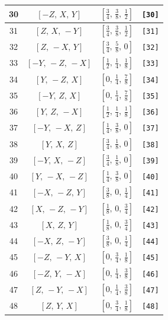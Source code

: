 \documentclass[fleqn,8pt]{jsarticle}
\begin{document}
\begin{longtable}{cccc}
30 & $\left[ - Z,\, X,\, Y \right]$ & $\left[ \frac{3}{4},\, \frac{3}{8},\, \frac{1}{2} \right]$ & {\tt [30]} \\ \hline
31 & $\left[ Z,\, X,\, - Y \right]$ & $\left[ \frac{3}{4},\, \frac{3}{8},\, \frac{1}{2} \right]$ & {\tt [31]} \\ \hline
32 & $\left[ Z,\, - X,\, Y \right]$ & $\left[ \frac{3}{4},\, \frac{5}{8},\, 0 \right]$ & {\tt [32]} \\ \hline
33 & $\left[ - Y,\, - Z,\, - X \right]$ & $\left[ \frac{1}{2},\, \frac{1}{4},\, \frac{1}{8} \right]$ & {\tt [33]} \\ \hline
34 & $\left[ Y,\, - Z,\, X \right]$ & $\left[ 0,\, \frac{1}{4},\, \frac{7}{8} \right]$ & {\tt [34]} \\ \hline
35 & $\left[ - Y,\, Z,\, X \right]$ & $\left[ 0,\, \frac{1}{4},\, \frac{7}{8} \right]$ & {\tt [35]} \\ \hline
36 & $\left[ Y,\, Z,\, - X \right]$ & $\left[ \frac{1}{2},\, \frac{1}{4},\, \frac{1}{8} \right]$ & {\tt [36]} \\ \hline
37 & $\left[ - Y,\, - X,\, Z \right]$ & $\left[ \frac{1}{4},\, \frac{3}{8},\, 0 \right]$ & {\tt [37]} \\ \hline
38 & $\left[ Y,\, X,\, Z \right]$ & $\left[ \frac{3}{4},\, \frac{1}{8},\, 0 \right]$ & {\tt [38]} \\ \hline
39 & $\left[ - Y,\, X,\, - Z \right]$ & $\left[ \frac{3}{4},\, \frac{1}{8},\, 0 \right]$ & {\tt [39]} \\ \hline
40 & $\left[ Y,\, - X,\, - Z \right]$ & $\left[ \frac{1}{4},\, \frac{3}{8},\, 0 \right]$ & {\tt [40]} \\ \hline
41 & $\left[ - X,\, - Z,\, Y \right]$ & $\left[ \frac{3}{8},\, 0,\, \frac{1}{4} \right]$ & {\tt [41]} \\ \hline
42 & $\left[ X,\, - Z,\, - Y \right]$ & $\left[ \frac{1}{8},\, 0,\, \frac{3}{4} \right]$ & {\tt [42]} \\ \hline
43 & $\left[ X,\, Z,\, Y \right]$ & $\left[ \frac{1}{8},\, 0,\, \frac{3}{4} \right]$ & {\tt [43]} \\ \hline
44 & $\left[ - X,\, Z,\, - Y \right]$ & $\left[ \frac{3}{8},\, 0,\, \frac{1}{4} \right]$ & {\tt [44]} \\ \hline
45 & $\left[ - Z,\, - Y,\, X \right]$ & $\left[ 0,\, \frac{3}{4},\, \frac{1}{8} \right]$ & {\tt [45]} \\ \hline
46 & $\left[ - Z,\, Y,\, - X \right]$ & $\left[ 0,\, \frac{1}{4},\, \frac{3}{8} \right]$ & {\tt [46]} \\ \hline
47 & $\left[ Z,\, - Y,\, - X \right]$ & $\left[ 0,\, \frac{1}{4},\, \frac{3}{8} \right]$ & {\tt [47]} \\ \hline
48 & $\left[ Z,\, Y,\, X \right]$ & $\left[ 0,\, \frac{3}{4},\, \frac{1}{8} \right]$ & {\tt [48]} \\
\end{longtable}
\end{document}
